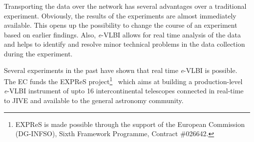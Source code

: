 Transporting the data over the network has several advantages over a
traditional experiment. Obviously, the results of the experiments are
almost immediately available. This opens up the possibility to change
the course of an experiment based on earlier findings. Also, {\it
  e}-VLBI allows for real time analysis of the data and helps to
identify and resolve minor technical problems in the data collection
during the experiment.

Several experiments in the past have shown that real time {\it e}-VLBI
is possible. The EC funds the EXPReS project\footnote{EXPReS is made
  possible through the support of the European Commission (DG-INFSO),
  Sixth Framework Programme, Contract \#026642.}~\cite{EXPReS} which
aims at building a production-level {\it e}-VLBI instrument of upto 16
intercontinental telescopes connected in real-time to JIVE and
available to the general astronomy community.

